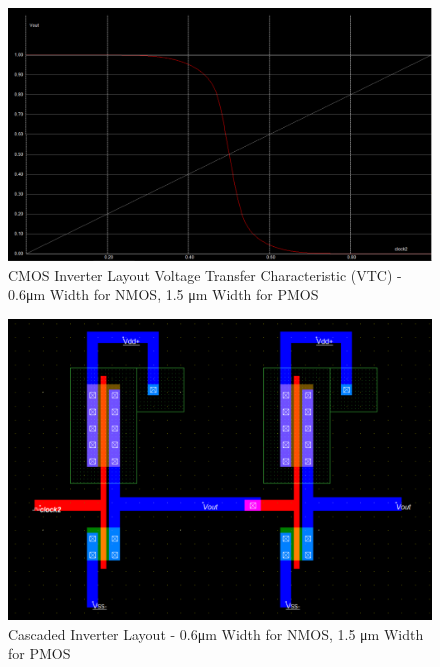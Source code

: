 \FloatBarrier

\FloatBarrier

\begin{figure}[h!]
	\centering
	\includegraphics[scale=0.50]{./images/inverter_vtc_06nmos_15pmos.PNG}
	\caption{CMOS Inverter Layout Voltage Transfer Characteristic (VTC) - 0.6\si{\micro\meter} Width for NMOS, 1.5 \si{\micro\meter} Width for PMOS}
	\label{fig:inverter_vtc_06nmos_15pmos}
\end{figure}

\FloatBarrier

\FloatBarrier

\begin{figure}[h!]
	\centering
	\includegraphics[scale=0.50]{./images/cascaded_inverter_06nmos15pmos.PNG}
	\caption{Cascaded Inverter Layout - 0.6\si{\micro\meter} Width for NMOS, 1.5 \si{\micro\meter} Width for PMOS}
	\label{fig:cascaded_inverter_06nmos15pmos}
\end{figure}

